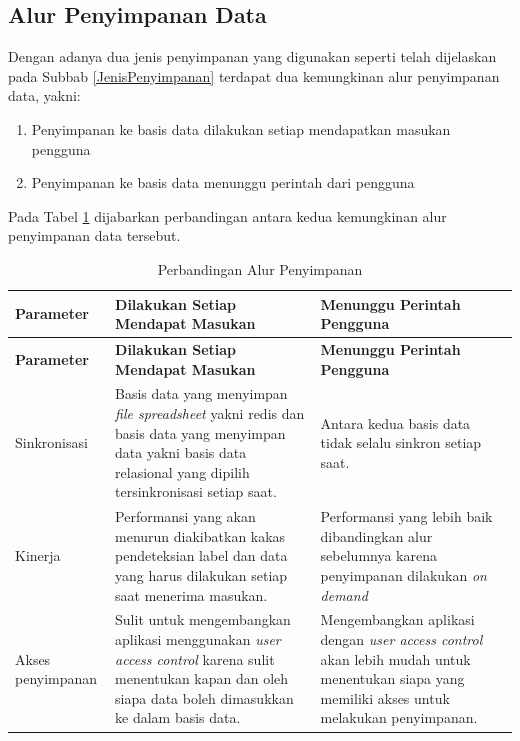 	\subsection{Alur Penyimpanan Data}
	Dengan adanya dua jenis penyimpanan yang digunakan seperti telah dijelaskan pada Subbab \ref{JenisPenyimpanan} terdapat dua kemungkinan alur penyimpanan data, yakni:
	\begin{enumerate}
		\item Penyimpanan ke basis data dilakukan setiap mendapatkan masukan pengguna
		\item Penyimpanan ke basis data menunggu perintah dari pengguna
	\end{enumerate}

	Pada Tabel \ref{ModelAlurPenyimpanan} dijabarkan perbandingan antara kedua kemungkinan alur penyimpanan data tersebut.

	\begin{small}
	\begin{longtable}{ | p{3cm} | p{4cm} | p{4cm} | }
	    \caption{Perbandingan Alur Penyimpanan}
	    \label{ModelAlurPenyimpanan}\\ \hline
	    \centering\bfseries{Parameter} & \centering\bfseries{Dilakukan Setiap Mendapat Masukan} & \centering\bfseries{Menunggu Perintah Pengguna} \tabularnewline \hline
	    \endfirsthead
	    \hline
	    \centering\bfseries{Parameter} & \centering\bfseries{Dilakukan Setiap Mendapat Masukan} & \centering\bfseries{Menunggu Perintah Pengguna} \tabularnewline \hline
	    \endhead
	    Sinkronisasi & Basis data yang menyimpan \textit{file spreadsheet} yakni redis dan basis data yang menyimpan data yakni basis data relasional yang dipilih tersinkronisasi setiap saat. & Antara kedua basis data tidak selalu sinkron setiap saat. \\ \hline
	    Kinerja & Performansi yang akan menurun diakibatkan kakas pendeteksian label dan data yang harus dilakukan setiap saat menerima masukan. & Performansi yang lebih baik dibandingkan alur sebelumnya karena penyimpanan dilakukan \textit{on demand} \\ \hline
	    Akses penyimpanan & Sulit untuk mengembangkan aplikasi menggunakan \textit{user access control} karena sulit menentukan kapan dan oleh siapa data boleh dimasukkan ke dalam basis data. & Mengembangkan aplikasi dengan \textit{user access control} akan lebih mudah untuk menentukan siapa yang memiliki akses untuk melakukan penyimpanan.\\ \hline
  	\end{longtable}
	\end{small}

